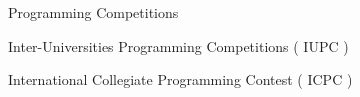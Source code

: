 

\begin{cventries}


  \cventry
    {{Programming Competitions}} %
    { } %
    {
      \begin{cvitems} %
        \item {Inter-Universities Programming Competitions ( IUPC )}
        \item {International Collegiate Programming Contest ( ICPC ) }
      \end{cvitems}
    }
    

\end{cventries}
